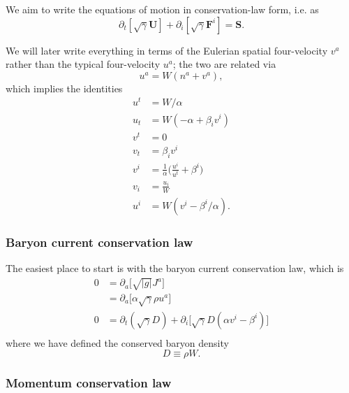 \documentclass[12pt]{article}
\numberwithin{equation}{section}
\begin{document}
We aim to write the equations of motion in conservation-law form, i.e. as
\begin{equation} \label{eq:RZ_cons_law}
\partial_t [\sqrt{\gamma} \bm{U}] + \partial_i [\sqrt{\gamma} \bm{F}^{i}] = \bm{S}.
\end{equation}

We will later write everything in terms of the Eulerian spatial four-velocity $v^a$ rather than the typical four-velocity $u^a$; the two are related via
\begin{equation}
u^a = W (n^a + v^a),
\end{equation}
which implies the identities
\begin{equation}
\begin{aligned}
u^t &= W/\alpha \\
u_t &= W (-\alpha + \beta_i v^i) \\
v^t &= 0 \\
v_t &= \beta_i v^i \\
v^i &= \frac{1}{\alpha} \Big( \frac{u^i}{u^t} + \beta^i \Big) \\
v_i &= \frac{u_i}{W} \\
u^i &= W (v^i - \beta^i/\alpha).
\end{aligned}
\end{equation}

\subsubsection{Baryon current conservation law}

The easiest place to start is with the baryon current conservation law, which is
\begin{equation}
\begin{aligned}
0 &= \partial_a \big[ \sqrt{|g|} J^{a} \big] \\
&= \partial_a \big[ \alpha \sqrt{\gamma} \rho u^a \big] \\
0 &= \partial_t (\sqrt{\gamma} D) + \partial_i \big[ \sqrt{\gamma} D (\alpha v^i - \beta^i) \big] \\
\end{aligned}
\end{equation}
where we have defined the conserved baryon density
\begin{equation}
D \equiv \rho W.
\end{equation}

\subsubsection{Momentum conservation law}
\end{document}
